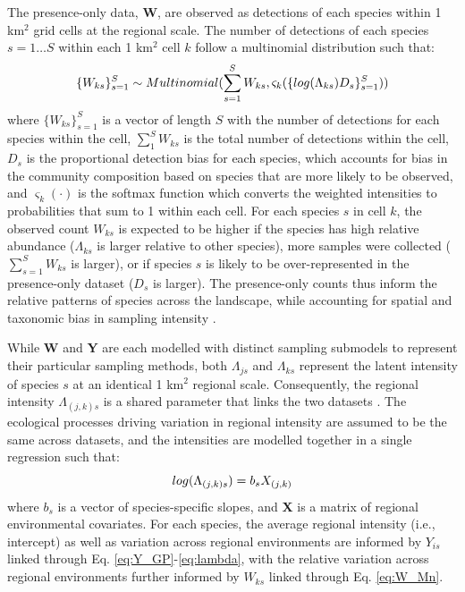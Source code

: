 \documentclass[preprint,review,times,12pt]{elsarticle}
\begin{document}
The presence-only data, \textbf{W}, are observed as detections of each species within 1 km$^2$ grid cells at the regional scale. The number of detections of each species $s=1 \dots S$ within each 1 km$^2$ cell $k$ follow a multinomial distribution such that:
    \begin{equation}
        \{W_{ks}\}_{s=1}^{S} \sim Multinomial(\sum_{s=1}^{S} W_{ks} , \varsigma_k(\{log(\Lambda_{ks})D_s\}_{s=1}^{S})) \\
        \label{eq:W_Mn}
    \end{equation}
where $\{W_{ks}\}_{s=1}^{S}$ is a vector of length $S$ with the number of detections for each species within the cell, $\sum_{1}^{S} W_{ks}$ is the total number of detections within the cell, $D_s$ is the proportional detection bias for each species, which accounts for bias in the community composition based on species that are more likely to be observed, and $\varsigma_k(\cdot)$ is the softmax function which converts the weighted intensities to probabilities that sum to 1 within each cell. For each species $s$ in cell $k$, the observed count $W_{ks}$ is expected to be higher if the species has high relative abundance ($\Lambda_{ks}$ is larger relative to other species), more samples were collected ($\sum_{s=1}^{S} W_{ks}$ is larger), or if species $s$ is likely to be over-represented in the presence-only dataset ($D_s$ is larger). The presence-only counts thus inform the relative patterns of species across the landscape, while accounting for spatial and taxonomic bias in sampling intensity \citep{Isaac2014}.

While \textbf{W} and \textbf{Y} are each modelled with distinct sampling submodels to represent their particular sampling methods, both $\Lambda_{js}$ and $\Lambda_{ks}$ represent the latent intensity of species $s$ at an identical 1 km$^2$ regional scale. Consequently, the regional intensity $\Lambda_{(j,k)s}$ is a shared parameter that links the two datasets \citep{Hefley2016,Isaac2019,Miller2019}. The ecological processes driving variation in regional intensity are assumed to be the same across datasets, and the intensities are modelled together in a single regression such that:
    \begin{equation}
        log(\Lambda_{(j,k)s}) = b_s X_{(j,k)} \\
        \label{eq:LAMBDA}
    \end{equation}
where $b_s$ is a vector of species-specific slopes, and \textbf{X} is a matrix of regional environmental covariates. For each species, the average regional intensity (i.e., intercept) as well as variation across regional environments are informed by $Y_{is}$ linked through Eq. \ref{eq:Y_GP}-\ref{eq:lambda}, with the relative variation across regional environments further informed by $W_{ks}$ linked through Eq. \ref{eq:W_Mn}.  
\end{document}
